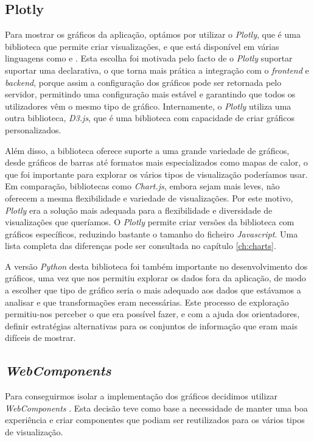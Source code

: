 \subsection{Plotly}

Para mostrar os gráficos da aplicação, optámos por utilizar o \textit{Plotly}, que é uma biblioteca  que permite criar visualizações, e que está disponível em várias linguagens como  e . Esta escolha foi motivada pelo facto de o \textit{Plotly} suportar suportar uma  declarativa, o que torna mais prática a integração com o \textit{frontend} e \textit{backend}, porque assim a configuração dos gráficos pode ser retornada pelo servidor, permitindo uma configuração mais estável e garantindo que todos os utilizadores vêm o mesmo tipo de gráfico. Internamente, o \textit{Plotly} utiliza uma outra biblioteca, \textit{D3.js}, que é uma biblioteca com capacidade de criar gráficos personalizados.

Além disso, a biblioteca oferece suporte a uma grande variedade de gráficos, desde gráficos de barras até formatos mais especializados como mapas de calor, o que foi importante para explorar os vários tipos de visualização poderíamos usar. Em comparação, bibliotecas como \textit{Chart.js}, embora sejam mais leves, não oferecem a mesma flexibilidade e variedade de visualizações. Por este motivo, \textit{Plotly} era a solução mais adequada para a flexibilidade e diversidade de visualizações que queríamos. O \textit{Plotly} permite criar versões da biblioteca com gráficos específicos, reduzindo bastante o tamanho do ficheiro \textit{Javascript}. Uma lista completa das diferenças pode ser consultada no capítulo \ref{ch:charts}.

A versão \textit{Python} desta biblioteca foi também importante no desenvolvimento dos gráficos, uma vez que nos permitiu explorar os dados fora da aplicação, de modo a escolher que tipo de gráfico seria o mais adequado aos dados que estávamos a analisar e que transformações eram necessárias. Este processo de exploração permitiu-nos perceber o que era possível fazer, e com a ajuda dos orientadores, definir estratégias alternativas para os conjuntos de informação que eram mais difíceis de mostrar.

\subsection{\textit{WebComponents}}

Para conseguirmos isolar a implementação dos gráficos decidimos utilizar \textit{WebComponents} \cite{webcomponents}. Esta decisão teve como base a necessidade de manter uma boa experiência e criar componentes que podiam ser reutilizados para os vários tipos de visualização. 

